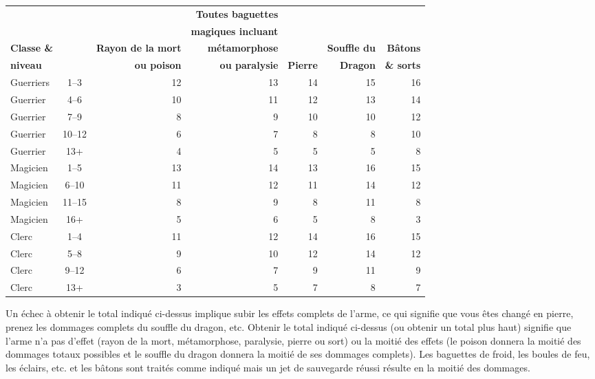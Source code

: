 \bigskip

\begin{tabular}{lcrrrrr}
&&& \textbf{Toutes baguettes} &&&\\
&&& \textbf{magiques incluant} &&& \\
\textbf{Classe \&} &  & \textbf{Rayon de la mort}   & \textbf{métamorphose} &                   & \textbf{Souffle du}   & \textbf{Bâtons} \\
\textbf{niveau}    & & \textbf{ou poison}          & \textbf{ou paralysie} & \textbf{Pierre}   & \textbf{Dragon}       & \textbf{\& sorts} \\
Guerriers   & 1--3   & 12 & 13 & 14 & 15 & 16 \\
Guerrier    & 4--6   & 10 & 11 & 12 & 13 & 14 \\
Guerrier    & 7--9   &  8 &  9 & 10 & 10 & 12 \\
Guerrier    & 10--12 &  6 &  7 &  8 &  8 & 10 \\
Guerrier    & 13+    &  4 &  5 &  5 &  5 &  8 \\
Magicien    & 1--5   & 13 & 14 & 13 & 16 & 15 \\
Magicien    & 6--10  & 11 & 12 & 11 & 14 & 12 \\
Magicien    & 11--15 &  8 &  9 &  8 & 11 &  8 \\
Magicien    & 16+    &  5 &  6 &  5 &  8 &  3 \\
Clerc       & 1--4   & 11 & 12 & 14 & 16 & 15 \\
Clerc       & 5--8   &  9 & 10 & 12 & 14 & 12 \\
Clerc       & 9--12  &  6 &  7 &  9 & 11 &  9 \\
Clerc       & 13+    &  3 &  5 &  7 &  8 &  7 \\
\end{tabular}

\bigskip

Un échec à obtenir le total indiqué ci-dessus implique subir les effets complets de l'arme, ce qui signifie que vous êtes changé en pierre, prenez les dommages complets du souffle du dragon, etc. Obtenir le total indiqué ci-dessus (ou obtenir un total plus haut) signifie que l'arme n'a pas d'effet (rayon de la mort, métamorphose, paralysie, pierre ou sort) ou la moitié des effets (le poison donnera la moitié des dommages totaux possibles et le souffle du dragon donnera la moitié de ses dommages complets). Les baguettes de froid, les boules de feu, les éclairs, etc. et les bâtons sont traités comme indiqué mais un jet de sauvegarde réussi résulte en la moitié des dommages.

